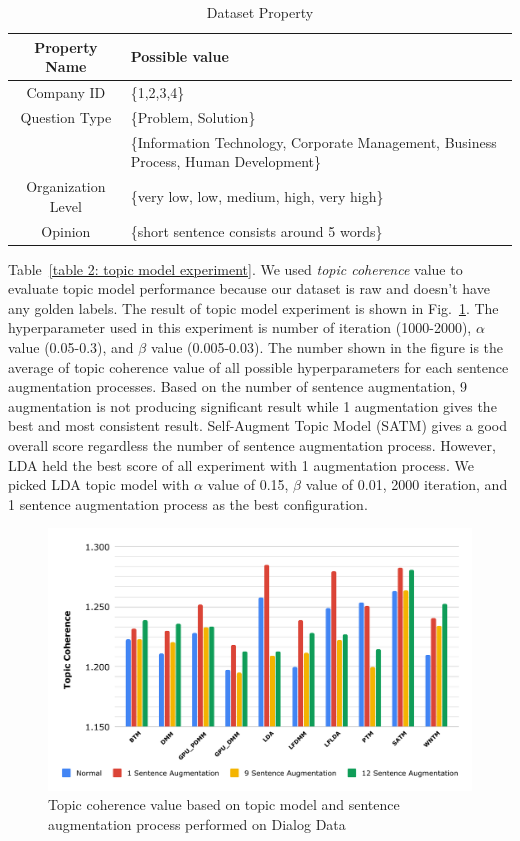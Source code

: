 \documentclass[10pt, conference, compsocconf]{IEEEtran}
\begin{document}
\begin{table}[h]
\renewcommand{\arraystretch}{1.3}
\caption{Dataset Property}
\label{table 4: dataset property}
\centering
{\begin{tabular}{|c|P{5cm}|}
\hline
\textbf{Property Name}&\textbf{Possible value}\\
\hline
Company ID&\{1,2,3,4\}  \\
\hline
Question Type&\{Problem, Solution\} \\
\hline
{}&\{Information Technology, Corporate Management, Business Process, Human Development\}\\
\hline
Organization Level&\{very low, low, medium, high, very high\} \\
\hline
Opinion&\{short sentence consists around 5 words\} \\
\hline
\end{tabular}}
\end{table}Table~\ref{table 2: topic model experiment}. We used {\it topic coherence} value to evaluate topic model performance because our dataset is raw and doesn't have any golden labels\cite{b6}. The result of topic model experiment is shown in Fig.~\ref{fig_tme}. The hyperparameter used in this experiment is number of iteration (1000-2000),  $\alpha$ value (0.05-0.3), and  $\beta$ value (0.005-0.03). The number shown in the figure is the average of topic coherence value of all possible hyperparameters for each sentence augmentation processes. Based on the number of sentence augmentation, 9 augmentation is not producing significant result while 1 augmentation gives the best and most consistent result. Self-Augment Topic Model (SATM) gives a good overall score regardless the number of sentence augmentation process. However, LDA held the best score of all experiment with 1 augmentation process. We picked LDA topic model with $\alpha$ value of 0.15, $\beta$ value of 0.01, 2000 iteration, and 1 sentence augmentation process as the best configuration.

\begin{figure}[b]
	\includegraphics[scale=0.425]{new-topic1.pdf}
	\caption{Topic coherence value based on topic model and sentence augmentation process performed on Dialog Data}
\label{fig_tme}
\end{figure}
\end{document}
